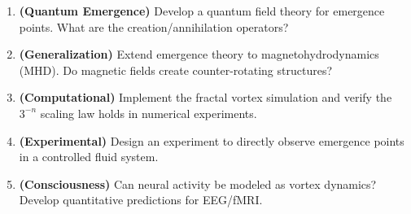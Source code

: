\begin{enumerate}
\item \textbf{(Quantum Emergence)} Develop a quantum field theory for emergence points. What are the creation/annihilation operators?

\item \textbf{(Generalization)} Extend emergence theory to magnetohydrodynamics (MHD). Do magnetic fields create counter-rotating structures?

\item \textbf{(Computational)} Implement the fractal vortex simulation and verify the $3^{-n}$ scaling law holds in numerical experiments.

\item \textbf{(Experimental)} Design an experiment to directly observe emergence points in a controlled fluid system.

\item \textbf{(Consciousness)} Can neural activity be modeled as vortex dynamics? Develop quantitative predictions for EEG/fMRI.
\end{enumerate}
